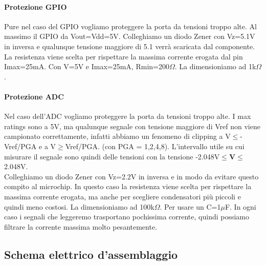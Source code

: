 \documentclass[10pt]{article}
\begin{document}
			\paragraph{Protezione GPIO}
				Pure nel caso del GPIO vogliamo proteggere la porta da tensioni troppo alte. Al massimo il GPIO da Vout=Vdd=5V. Colleghiamo un diodo Zener con Vz=5.1V in inversa e qualunque tensione maggiore di 5.1 verrà scaricata dal componente.
				La resistenza viene scelta per rispettare la massima corrente erogata dal pin Imax=25mA. Con V=5V e Imax=25mA, Rmin=200\(\Omega\). La dimensioniamo ad 1k\(\Omega\).
			\paragraph{Protezione ADC}
				Nel caso dell'ADC vogliamo proteggere la porta da tensioni troppo alte. I max ratings sono a 5V, ma qualunque segnale con tensione maggiore di Vref non viene campionato correttamente,
				infatti abbiamo un fenomeno di clipping a V\(\le\)-Vref/PGA e a V\(\ge\)Vref/PGA. (con PGA = 1,2,4,8).
				L'intervallo utile su cui misurare il segnale sono quindi delle tensioni con la tensione -2.048V\(\le\)\textbf{V}\(\le\)2.048V.\\
				Colleghiamo un diodo Zener con Vz=2.2V in inversa e in modo da evitare questo compito al microchip.
				In questo caso la resistenza viene scelta per rispettare la massima corrente erogata, ma anche per scegliere condensatori più piccoli e quindi meno costosi.
				La dimensioniamo ad 100k\(\Omega\). Per usare un C=1\(\mu\)F. In ogni caso i segnali che leggeremo trasportano pochissima corrente, quindi possiamo filtrare la corrente massima molto pesantemente.
	\subsection{Schema elettrico d'assemblaggio}
\end{document}
